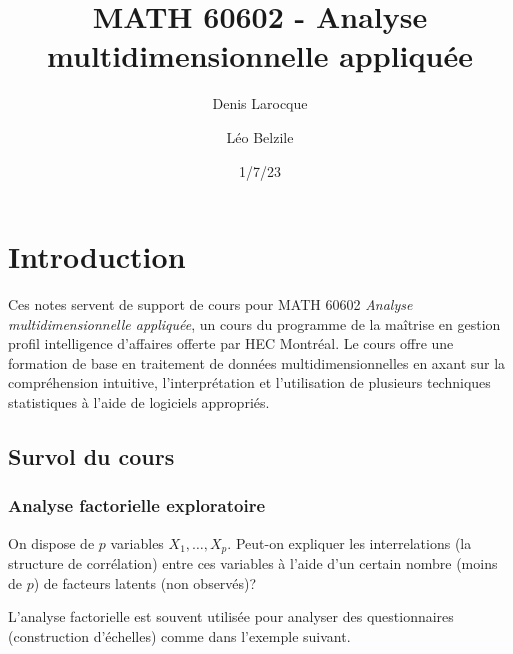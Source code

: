 \documentclass[
  11pt,
  letterpaper,
]{scrbook}
\title{MATH 60602 - Analyse multidimensionnelle appliquée}
\author{Denis Larocque \and Léo Belzile}
\date{1/7/23}
\renewcommand*\contentsname{Table des matières}
\newcommand\contentsname{Table des matières}
\theoremstyle{definition}
\theoremstyle{remark}
\begin{document}


\ifdefined\Shaded\renewenvironment{Shaded}{\begin{tcolorbox}[borderline west={3pt}{0pt}{shadecolor}, enhanced, breakable, frame hidden, boxrule=0pt, sharp corners, interior hidden]}{\end{tcolorbox}}\fi

\renewcommand*\contentsname{Table des matières}
{
\setcounter{tocdepth}{2}
\tableofcontents
}
\mainmatter
{}

\hypertarget{introduction}{%
\chapter{Introduction}\label{introduction}}

Ces notes servent de support de cours pour MATH 60602 \emph{Analyse
multidimensionnelle appliquée}, un cours du programme de la maîtrise en
gestion profil intelligence d'affaires offerte par HEC Montréal. Le
cours offre une formation de base en traitement de données
multidimensionnelles en axant sur la compréhension intuitive,
l'interprétation et l'utilisation de plusieurs techniques statistiques à
l'aide de logiciels appropriés.

\hypertarget{survol-du-cours}{%
\section{Survol du cours}\label{survol-du-cours}}

\hypertarget{analyse-factorielle-exploratoire}{%
\subsection{Analyse factorielle
exploratoire}\label{analyse-factorielle-exploratoire}}

On dispose de \(p\) variables \(X_1, \ldots, X_p\). Peut-on expliquer
les interrelations (la structure de corrélation) entre ces variables à
l'aide d'un certain nombre (moins de \(p\)) de facteurs latents (non
observés)?

L'analyse factorielle est souvent utilisée pour analyser des
questionnaires (construction d'échelles) comme dans l'exemple suivant.
\end{document}
